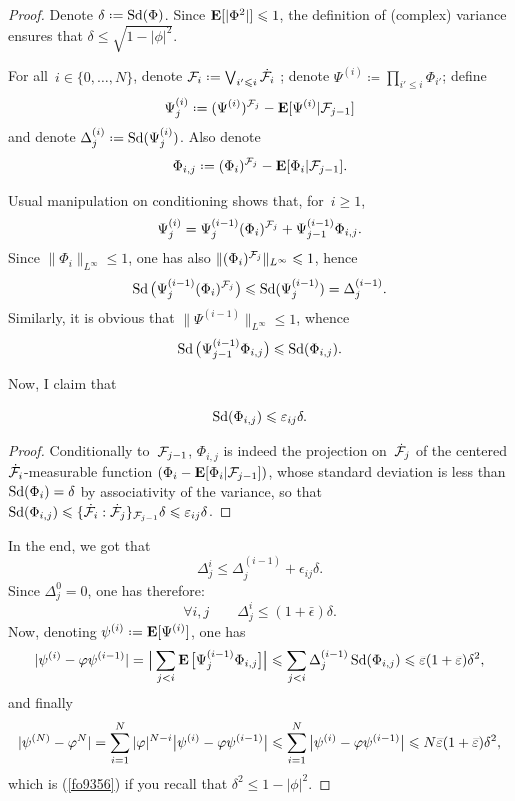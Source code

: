 \begin{proof}
Denote $\delta \coloneqq \ecty(\Phi)$. Since $\mathop{\smash{\mathbf{E}}}\nolimits[|\Phi^2|] \leqslant 1$,
the definition of (complex) variance ensures that $\delta \leq \sqrt{1-|\phi|^2}$.

For all~$i \in \{0,\ldots,N\}$, denote $\mcal{F}_i \coloneqq \bigvee_{i'\leq i}\dot{\mcal{F}}_i$ ;
denote $\Psi^{(i)} \coloneqq \prod_{i'\leq i} \Phi_{i'}$; define
\[ \Psi^{(i)}_j \coloneqq (\Psi^{(i)})^{\mcal{F}_j} - \EE[\Psi^{(i)}|\mcal{F}_{j-1}] \]
and denote $\Delta^{(i)}_j \coloneqq \ecty(\Psi^{(i)}_j)$.
Also denote
\[ \Phi_{i,j} \coloneqq (\Phi_i)^{\mcal{F}_j} - \EE[\Phi_i|\mcal{F}_{j-1}] .\]

Usual manipulation on conditioning shows that, for~$i\geq1$,
\[ \Psi^{(i)}_j = \Psi^{(i-1)}_j (\Phi_i)^{\mathcal{F}_j}
+ \Psi^{(i-1)}_{j-1} \Phi_{i,j} .\]
Since $\|\Phi_i\|_{L^\infty} \leq 1$,
one has also $\| (\Phi_i)^{\mathcal{F}_j} \|_{L^\infty} \leqslant 1$, hence
\[ \ecty\big( \Psi^{(i-1)}_j (\Phi_i)^{\mcal{F}_j} \big)
\leq \ecty(\Psi^{(i-1)}_j) = \Delta^{(i-1)}_j .\]
%
Similarly, it is obvious that $\|\Psi^{(i-1)}\|_{L^\infty} \leq 1$, whence
\[ \ecty\big( \Psi^{(i-1)}_{j-1} \Phi_{i,j} \big) \leq \ecty(\Phi_{i,j}) .\]

Now, I claim that
%
\begin{Clm}\label{clm-dld}
\[ \operatorname{Sd}(\Phi_{i,j}) \leqslant \varepsilon_{ij} \delta .\]
\end{Clm}
%
\begingroup{}
\begin{proof}
Conditionally to~$\mathcal{F}_{j-1}$, $\Phi_{i,j}$ is indeed the projection on~$\dot{\mcal{F}}_{j}$ of the centered $\dot{\mcal{F}}_i$-measurable function $(\Phi_i - \mathop{\smash{\mathbf{E}}}\nolimits[\Phi_i|\mathcal{F}_{j-1}])$, whose standard deviation is less than $\operatorname{Sd}(\Phi_i) = \delta$ by associativity of the variance, so that $\ecty(\Phi_{i,j}) \leq {\{\dot{\mcal{F}}_i:\dot{\mcal{F}}_j\}_{\mcal{F}_{j-1}}} \delta \ab \leq \epsilon_{ij} \delta$.
\end{proof}\endgroup

In the end, we got that
\[ \Delta^i_j \leq \Delta^{(i-1)}_j + \epsilon_{ij} \delta .\]
Since $\Delta^0_j = 0$, one has therefore:
\[ \forall i,j \qquad \Delta^i_j \leq (1+\bar\epsilon) \delta .\]
%
Now, denoting $\psi^{(i)} \coloneqq \EE[\Psi^{(i)}]$, one has
\[ | \psi^{(i)} - \phi\psi^{(i-1)} |
= \Big| \sum_{j<i} \EE\big[ \Psi^{(i-1)}_j \Phi_{i,j} \big] \Big|
\leq \sum_{j<i} \Delta^{(i-1)}_j \ecty(\Phi_{i,j})
\leq \bar\epsilon (1+\bar{\epsilon}) \delta^2 ,\]
%
and finally
\[ | \psi^{(N)} - \phi^N |
= \sum_{i=1}^N |\phi|^{N-i} \big|\psi^{(i)} - \phi\psi^{(i-1)}\big|
\leq \sum_{i=1}^N \big|\psi^{(i)} - \phi\psi^{(i-1)}\big| \\
\leq N \bar\epsilon(1+\bar\epsilon) \delta^2 ,\]
which is (\ref{fo9356}) if you recall that $\delta^2 \leq 1-|\phi|^2$.
\end{proof}


